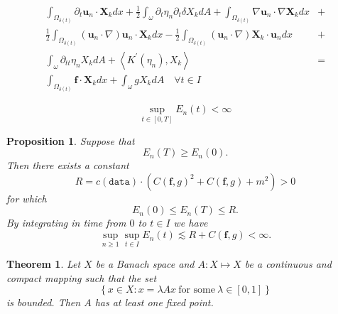 \documentclass[10pt,a4paper]{amsart}
\newtheorem{proposition}{Proposition}
\newtheorem{theorem}{Theorem}
\begin{document}
\begin{equation}\label{eqn:xk}
\begin{aligned}\int_{\Omega_{\delta\left(t\right)}}\partial_{t}\mathbf{u}_{n}\cdot\mathbf{X}_{k}dx+\frac{1}{2}\int_{\omega}\partial_{t}\eta_{n}\partial_{t}\delta X_{k}dA+\int_{\Omega_{\delta\left(t\right)}}\nabla\mathbf{u}_{n}\cdot\nabla\mathbf{X}_{k}dx & +\\
\frac{1}{2}\int_{\Omega_{\delta\left(t\right)}}\left(\mathbf{u}_{n}\cdot\nabla\right)\mathbf{u}_{n}\cdot\mathbf{X}_{k}dx-\frac{1}{2}\int_{\Omega_{\delta\left(t\right)}}\left(\mathbf{u}_{n}\cdot\nabla\right)\mathbf{X}_{k}\cdot\mathbf{u}_{n}dx & +\\
\int_{\omega}\partial_{tt}\eta_{n}X_{k}dA+\left\langle K^{\prime}\left(\eta_{n}\right),X_{k}\right\rangle  & =\\
\int_{\Omega_{\delta\left(t\right)}}\mathbf{f}\cdot\mathbf{X}_{k}dx+\int_{\omega}gX_{k}dA\quad\forall t\in I
\end{aligned}
\end{equation}

\begin{equation}\label{eqn:cons-gronwall}
\sup_{t\in\left[0,T\right]}E_{n}\left(t\right)<\infty 
\end{equation}

\begin{proposition}\label{prop: invariant-ball} 
Suppose that \[E_{n} (T) \ge E_{n} (0).\]
Then
there exists a constant    
\begin{equation}\label{eqn:R-chap02}
R=c\left(\texttt{data}\right)\cdot\left(C\left(\mathbf{f},g\right)^{2}+C\left(\mathbf{f},g\right)+m^{2}\right)>0
\end{equation}
for which
 \[E_{n} \left(0 \right) \le E_{n} \left(T \right) \le R.\]
By integrating in time from $0$ to $t\in I$ we have
\begin{equation}\label{eqn:chap02-bound-E-n}
\sup_{n\ge1}\sup_{t\in I}E_{n}\left(t\right)\lesssim R+C(\mathbf{f},g)<\infty.
\end{equation}

\end{proposition}

\begin{theorem}\label{thm:Schaeffer}
Let $X$ be a Banach space and   $A :  X \mapsto X$ be a continuous and compact mapping such that the set \[\left\{ x\in X:x=\lambda Ax\ \text{for some}\ \lambda\in\left[0,1\right]\right\} \]
is bounded. Then $A$ has at least one fixed point.
\end{theorem}
\end{document}
